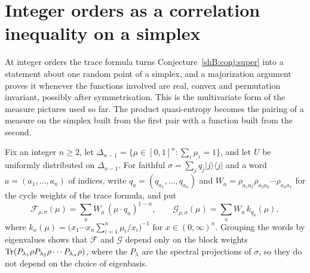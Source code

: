 \section{Integer orders as a correlation inequality on a simplex}\label{shB:sec:simplex}

At integer orders the trace formula turns Conjecture~\ref{shB:conj:super} into a statement about one random point of a simplex, and a majorization argument proves it whenever the functions involved are real, convex and permutation invariant, possibly after symmetrisation. This is the multivariate form of the measure pictures used so far. The product quasi-entropy becomes the pairing of a measure on the simplex built from the first pair with a function built from the second.

Fix an integer $n\ge2$, let $\Delta_{n-1}=\{\mu\in[0,1]^n:\sum_i\mu_i=1\}$, and let $U$ be uniformly distributed on $\Delta_{n-1}$. For faithful $\sigma=\sum_jq_j|j\rangle\langle j|$ and a word $a=(a_1,\dots,a_n)$ of indices, write $q_a=(q_{a_1},\dots,q_{a_n})$ and $W_a=\rho_{a_1a_2}\rho_{a_2a_3}\cdots\rho_{a_na_1}$ for the cycle weights of the trace formula, and put
\[
\mathcal F_{\rho,\sigma}(\mu)=\sum_aW_a\,(\mu\cdot q_a)^{1-n},\qquad \mathcal G_{\rho,\sigma}(\mu)=\sum_aW_a\,k_{q_a}(\mu),
\]
where $k_x(\mu)=\big(x_1\cdots x_n\sum_{i=1}^n\mu_i/x_i\big)^{-1}$ for $x\in(0,\infty)^n$. Grouping the words by eigenvalues shows that $\mathcal F$ and $\mathcal G$ depend only on the block weights $\operatorname{Tr}(P_{\lambda_1}\rho P_{\lambda_2}\rho\cdots P_{\lambda_n}\rho)$, where the $P_\lambda$ are the spectral projections of $\sigma$, so they do not depend on the choice of eigenbasis.

